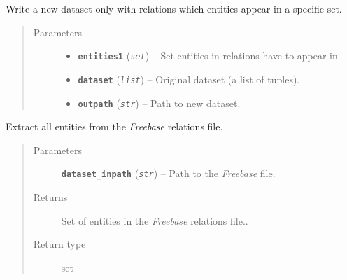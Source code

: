 \documentclass[letterpaper,10pt,english]{sphinxmanual}
\begin{document}

\begin{fulllineitems}
\label{src.trans_e:src.trans_e.contains_entities.create_new_dataset}
Write a new dataset only with relations which entities appear in a specific set.
\begin{quote}\begin{description}
\item[{Parameters}] \leavevmode\begin{itemize}
\item {} 
\textbf{\texttt{entities1}} (\emph{\texttt{set}}) -- Set entities in relations have to appear in.

\item {} 
\textbf{\texttt{dataset}} (\emph{\texttt{list}}) -- Original dataset (a list of tuples).

\item {} 
\textbf{\texttt{outpath}} (\emph{\texttt{str}}) -- Path to new dataset.

\end{itemize}

\end{description}\end{quote}

\end{fulllineitems}


\begin{fulllineitems}
\label{src.trans_e:src.trans_e.contains_entities.extract_entities_from_relation_dataset}
Extract all entities from the \emph{Freebase} relations file.
\begin{quote}\begin{description}
\item[{Parameters}] \leavevmode
\textbf{\texttt{dataset\_inpath}} (\emph{\texttt{str}}) -- Path to the \emph{Freebase} file.

\item[{Returns}] \leavevmode
Set of entities in the \emph{Freebase} relations file..

\item[{Return type}] \leavevmode
set

\end{description}\end{quote}

\end{fulllineitems}
\end{document}

